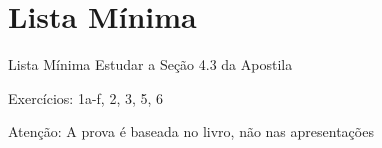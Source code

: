 %

\section{Lista Mínima}

\begin{frame}{Lista Mínima}
  Estudar a Seção 4.3 da Apostila

  Exercícios: 1a-f, 2, 3, 5, 6

  \vfill
  Atenção: A prova é baseada no livro, não nas apresentações
\end{frame}


